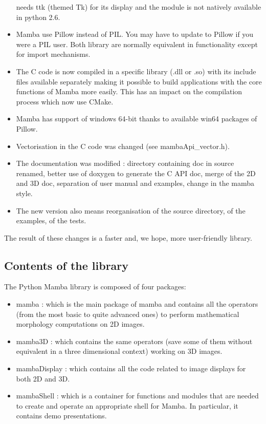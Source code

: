 \documentclass[a4paper,10pt,oneside]{article}
\begin{document}
\begin{itemize}
needs ttk (themed Tk) for its display and the module is not natively available
in python 2.6.
\item Mamba use Pillow instead of PIL. You may have to update to Pillow if
you were a PIL user. Both library are normally equivalent in functionality
except for import mechanisms.
\item The C code is now compiled in a specific library (.dll or .so) with
its include files available separately making it possible to build applications
with the core functions of Mamba more easily. This has an impact on the
compilation process which now use CMake.
\item Mamba has support of windows 64-bit thanks to available win64 packages
of Pillow.
\item Vectorisation in the C code was changed (see mambaApi\_vector.h).
\item The documentation was modified : directory containing doc in source renamed,
better use of doxygen to generate the C API doc, merge of the 2D and 3D doc,
separation of user manual and examples, change in the mamba style.
\item The new version also means reorganisation of the source directory, of the
examples, of the tests.
\end{itemize}

The result of these changes is a faster and, we hope, more user-friendly
library.

\subsection{Contents of the library}

The Python Mamba library is composed of four packages:
\begin{itemize}
\item mamba : which is the main package of mamba and contains all the operators
(from the most basic to quite advanced ones) to perform mathematical morphology
computations on 2D images.
\item mamba3D : which contains the same operators (save some of them without
equivalent in a three dimensional context) working on 3D images.
\item mambaDisplay : which contains all the code related to image displays for
both 2D and 3D.
\item mambaShell : which is a container for functions and modules that are
needed to create and operate an appropriate shell for Mamba. In particular, it
contains demo presentations.
\end{itemize}
\end{document}
